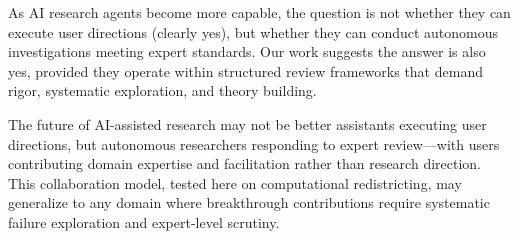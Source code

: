 As AI research agents become more capable, the question is not whether they can execute user directions (clearly yes), but whether they can conduct autonomous investigations meeting expert standards. Our work suggests the answer is also yes, provided they operate within structured review frameworks that demand rigor, systematic exploration, and theory building.

The future of AI-assisted research may not be better assistants executing user directions, but autonomous researchers responding to expert review---with users contributing domain expertise and facilitation rather than research direction. This collaboration model, tested here on computational redistricting, may generalize to any domain where breakthrough contributions require systematic failure exploration and expert-level scrutiny.
